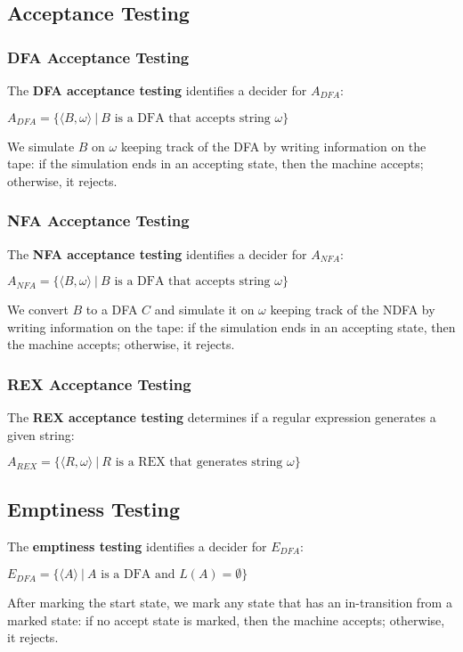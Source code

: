 \documentclass{article}
\begin{document}
\subsection{Acceptance Testing}
\subsubsection{DFA Acceptance Testing}
The \textbf{DFA acceptance testing} identifies a decider for $A_{DFA}$:
\begin{center}
    $A_{DFA} = \{\langle B,\omega \rangle \ | \ B \text{ is a DFA that accepts string }\omega\}$
\end{center}
We simulate $B$ on $\omega$ keeping track of the DFA by writing information on the tape: if the simulation ends in an accepting state, then the machine accepts; otherwise, it rejects.
\subsubsection{NFA Acceptance Testing}
The \textbf{NFA acceptance testing} identifies a decider for $A_{NFA}$:
\begin{center}
    $A_{NFA} = \{\langle B,\omega \rangle \ | \ B \text{ is a DFA that accepts string }\omega\}$
\end{center}
We convert $B$ to a DFA $C$ and simulate it on $\omega$ keeping track of the NDFA by writing information on the tape: if the simulation ends in an accepting state, then the machine accepts; otherwise, it rejects.
\subsubsection{REX Acceptance Testing}
The \textbf{REX acceptance testing} determines if a regular expression generates a given string:
\begin{center}
    $A_{REX} = \{\langle R,\omega \rangle \ | \ R \text{ is a REX that generates string }\omega\}$
\end{center}
\subsection{Emptiness Testing}
The \textbf{emptiness testing} identifies a decider for $E_{DFA}$:
\begin{center}
    $E_{DFA} = \{\langle A\rangle \ | \ A \text{ is a DFA and }L(A) = \emptyset\}$
\end{center}
After marking the start state, we mark any state that has an in-transition from a marked state: if no accept state is marked, then the machine accepts; otherwise, it rejects.
\end{document}
